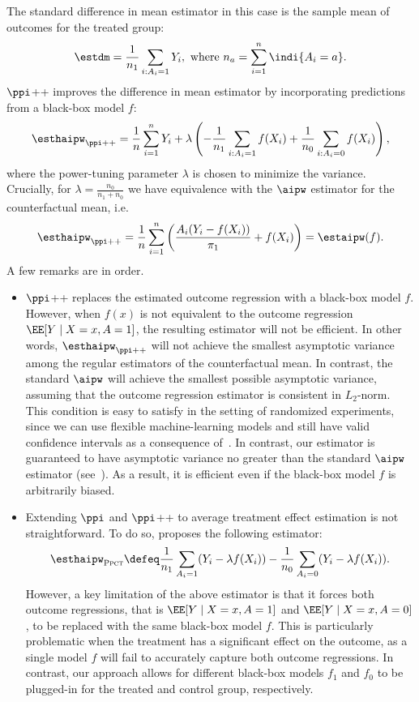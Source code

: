   The  standard difference in mean estimator in this case is the sample mean of outcomes for the treated group: $$\estdm  = \frac{1}{n_1} \sum_{i: A_i=1} Y_i,~\text{where}~n_a = \sum_{i=1}^n \indi\{A_i=a\}.$$  $\ppi$++ improves the difference in mean estimator by incorporating predictions from a black-box model $f$: 
 $$ \esthaipw_{\ppi++} =  \frac{1}{n} \sum_{i=1}^n Y_i  + \lambda \left( -\frac{1}{n_1} \sum_{i:A_i=1} f(X_i) + \frac{1}{n_0} \sum_{i:A_i=0} f(X_i) \right),$$
 where the power-tuning parameter $\lambda$ is chosen to minimize the variance. Crucially, for $\lambda =\frac{n_0}{n_1+n_0}$ we have equivalence with the $\aipw$ estimator for the counterfactual mean, i.e.
 $$
  \esthaipw_{\ppi++}  = \frac{1}{n} \sum_{i=1}^n \left(\frac{A_i (Y_i- f(X_i))}{\pi_1} + f(X_i) \right) = \estaipw(f).
 $$
 A few remarks are in order.
 \begin{itemize}
     \item $\ppi$++ replaces the estimated outcome regression with a black-box  model $f$. However, when $f(x)$ is not equivalent to the outcome regression $\EE[Y\mid X=x,A=1] $, the resulting estimator will not be efficient. In other words, $\esthaipw_{\ppi++}$ will not achieve the smallest asymptotic variance among the regular estimators of the counterfactual mean. In contrast, the standard $\aipw$ will achieve the smallest possible asymptotic variance, assuming that the outcome regression estimator is consistent in $L_2$-norm. This condition is easy to satisfy in the setting of randomized experiments, since we can use  flexible machine-learning models and still have  valid confidence intervals as a consequence of~. In contrast, our estimator is guaranteed to have asymptotic variance no greater than the standard $\aipw$ estimator (see~). As a result, it is efficient even if the black-box model $f$ is arbitrarily biased.
     \item Extending $\ppi$ and $\ppi$++ to average treatment effect estimation is not straightforward. To do so, \citet{poulet2025prediction} proposes the following estimator:
     $$
     \esthaipw_{\textsc{Ppct}} \defeq 
     \frac{1}{n_1} \sum_{A_i =1} (Y_i - \lambda f(X_i)) -  \frac{1}{n_0} \sum_{A_i =0} (Y_i - \lambda f(X_i)). 
     $$
 However, a key limitation of the above estimator is that it forces both outcome regressions, that is \(\EE[Y\mid X=x,A=1]\) and \(\EE[Y\mid X=x,A=0]\), to be replaced with the same black-box model \( f \). This is particularly problematic when the treatment has a significant effect on the outcome, as a single model \( f \) will fail to accurately capture both outcome regressions. In contrast, our approach  allows for different black-box models $f_1$ and $f_0$ to be plugged-in for the treated and control group, respectively.
    

\end{itemize}
